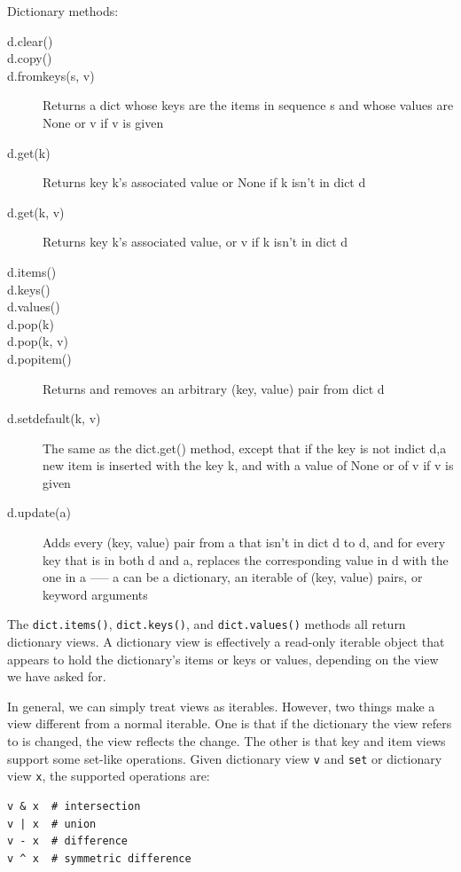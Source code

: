Dictionary methods:
\begin{description}
\item[d.clear()] 
\item[d.copy()] 
\item[d.fromkeys(s, v)] Returns a dict whose keys are the items in sequence s and whose values are None or v if v is given
\item[d.get(k)] Returns key k's associated value or None if k isn't in dict d
\item[d.get(k, v)] Returns key k's associated value, or v if k isn't in dict d
\item[d.items()] 
\item[d.keys()] 
\item[d.values()] 
\item[d.pop(k)] 
\item[d.pop(k, v)] 
\item[d.popitem()] Returns and removes an arbitrary (key, value) pair from dict d
\item[d.setdefault(k, v)] The same as the dict.get() method, except that if the key is not indict d,a new item is inserted with the key k, and with a value of None or of v if v is given
\item[d.update(a)] Adds every (key, value) pair from a that isn’t in dict d to d, and for every key that is in both d and a, replaces the corresponding value in d with the one in a --— a can be a dictionary, an iterable of (key, value) pairs, or keyword arguments
\end{description}



The \verb|dict.items()|, \verb|dict.keys()|, and \verb|dict.values()| methods all return dictionary views.
A dictionary view is effectively a read-only iterable object that appears to hold the dictionary’s items or keys or values, depending on the view we have asked for.


In general, we can simply treat views as iterables.
However, two things make a view different from a normal iterable.
One is that if the dictionary the view refers to is changed, the view reflects the change.
The other is that key and item views support some set-like operations.
Given dictionary view \verb|v| and \verb|set| or dictionary view \verb|x|, the supported operations are:
\begin{verbatim}
v & x  # intersection
v | x  # union
v - x  # difference
v ^ x  # symmetric difference
\end{verbatim}



